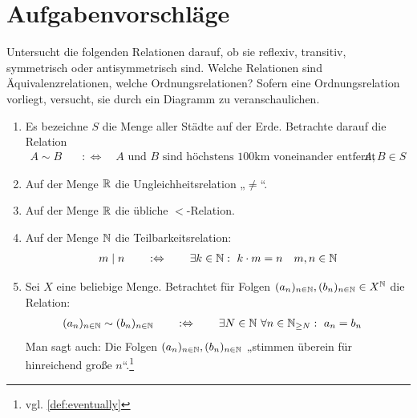 \clearpage
\section{Aufgabenvorschläge}


\begin{aufg} \label{aufg:relationen}
    Untersucht die folgenden Relationen darauf, ob sie reflexiv, transitiv, symmetrisch oder antisymmetrisch sind. Welche Relationen sind Äquivalenzrelationen, welche Ordnungsrelationen? Sofern eine Ordnungsrelation vorliegt, versucht, sie durch ein Diagramm zu veranschaulichen.
    \begin{enumerate}
        \item Es bezeichne $S$ die Menge aller Städte auf der Erde. Betrachte darauf die Relation
        \begin{align*}
            A \sim B \quad& :\Leftrightarrow\quad \text{$A$ und $B$ sind höchstens 100km voneinander entfernt} && A,B\in S
        \end{align*}
        \item Auf der Menge $\mathbb R$ die Ungleichheitsrelation „$\neq$“.
        \item Auf der Menge $\mathbb R$ die übliche $<$-Relation.
        \item Auf der Menge $\mathbb N$ die Teilbarkeitsrelation:
        \begin{align*}
            m\mid n \qquad:\Leftrightarrow\qquad \exists k\in \N:\ k\cdot m=n && m,n\in \N
        \end{align*}
        \item Sei $X$ eine beliebige Menge. Betrachtet für Folgen $(a_n)_{n\in \mathbb N},(b_n)_{n\in \mathbb N} \in X^\mathbb N$ die Relation:
        \begin{align*}
            (a_n)_{n\in \N} \sim (b_n)_{n\in \N} \qquad & :\Leftrightarrow\qquad \exists N\in \N\ \forall n\in \N_{\ge N}:\ a_n=b_n
        \end{align*}
            Man sagt auch: Die Folgen $(a_n)_{n\in \mathbb N},(b_n)_{n\in \mathbb N}$ „stimmen überein für hinreichend große $n$“.\footnote{vgl. \cref{def:eventually}}
    \end{enumerate}
\end{aufg}


